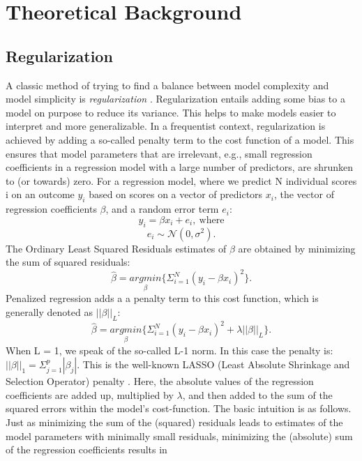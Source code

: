 \documentclass[]{interact}
\theoremstyle{plain}%
\theoremstyle{definition}
\theoremstyle{remark}
\begin{document}
\hypertarget{theoretical-background}{%
\section{Theoretical Background}\label{theoretical-background}}

\hypertarget{regularization}{%
\subsection{Regularization}\label{regularization}}

A classic method of trying to find a balance between model complexity
and model simplicity is \emph{regularization}
\citep{hastie_statistical_2015}. Regularization entails adding some bias
to a model on purpose to reduce its variance. This helps to make models
easier to interpret and more generalizable. In a frequentist context,
regularization is achieved by adding a so-called penalty term to the
cost function of a model. This ensures that model parameters that are
irrelevant, e.g., small regression coefficients in a regression model
with a large number of predictors, are shrunken to (or towards) zero.
For a regression model, where we predict N individual scores i on an
outcome \(y_i\) based on scores on a vector of predictors \(x_i\), the
vector of regression coefficients \(\beta\), and a random error term
\(e_i\): \[y_i = \beta x_i + e_i, \ \text{where} \]
\[e_i \sim \mathcal{N}(0, \sigma^2). \] The Ordinary Least Squared
Residuals estimates of \(\beta\) are obtained by minimizing the sum of
squared residuals:
\[ \hat{\beta} = \underset{\beta}{argmin} \{ \Sigma_{i=1}^N(y_i - \beta x_{i} )^2 \}.\]
Penalized regression adds a a penalty term to this cost function, which
is generally denoted as \(||\beta||_L\):
\[ \hat{\beta} = \underset{\beta}{argmin} \{ \Sigma_{i=1}^N(y_i - \beta x_{i} )^2 + \lambda ||\beta||_{L} \}.\]
When L = 1, we speak of the so-called L-1 norm. In this case the penalty
is: \(||\beta||_1 = \Sigma_{j=1}^p |\beta_j|\). This is the well-known
LASSO (Least Absolute Shrinkage and Selection Operator) penalty
\citep{tibshirani_regression_1996, tibshirani_regression_2011}. Here,
the absolute values of the regression coefficients are added up,
multiplied by \(\lambda\), and then added to the sum of the squared
errors within the model's cost-function. The basic intuition is as
follows. Just as minimizing the sum of the (squared) residuals leads to
estimates of the model parameters with minimally small residuals,
minimizing the (absolute) sum of the regression coefficients results in
\end{document}
